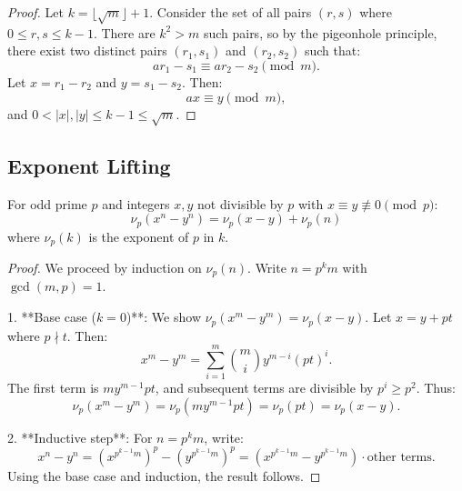 \documentclass{scrartcl} %
\begin{document}
\begin{proof}
Let $k = \lfloor \sqrt{m} \rfloor + 1$. Consider the set of all pairs $(r, s)$ where $0 \leq r, s \leq k-1$. There are $k^2 > m$ such pairs, so by the pigeonhole principle, there exist two distinct pairs $(r_1, s_1)$ and $(r_2, s_2)$ such that:
\[
a r_1 - s_1 \equiv a r_2 - s_2 \pmod{m}.
\]
Let $x = r_1 - r_2$ and $y = s_1 - s_2$. Then:
\[
a x \equiv y \pmod{m},
\]
and $0 < |x|, |y| \leq k-1 \leq \sqrt{m}$.
\end{proof}

\subsection{Exponent Lifting}

\begin{theorem}\label{thm:liftingtheexponent}
For odd prime $p$ and integers $x,y$ not divisible by $p$ with $x \equiv y \not\equiv 0 \pmod{p}$:
\[ \nu_p(x^n - y^n) = \nu_p(x - y) + \nu_p(n) \]
where $\nu_p(k)$ is the exponent of $p$ in $k$.
\end{theorem}

\begin{proof}
We proceed by induction on $\nu_p(n)$. Write $n = p^k m$ with $\gcd(m, p) = 1$.

1. **Base case ($k = 0$)**: We show $\nu_p(x^m - y^m) = \nu_p(x - y)$. Let $x = y + p t$ where $p \nmid t$. Then:
\[
x^m - y^m = \sum_{i=1}^m \binom{m}{i} y^{m-i} (p t)^i.
\]
The first term is $m y^{m-1} p t$, and subsequent terms are divisible by $p^{i} \geq p^2$. Thus:
\[
\nu_p(x^m - y^m) = \nu_p(m y^{m-1} p t) = \nu_p(p t) = \nu_p(x - y).
\]

2. **Inductive step**: For $n = p^k m$, write:
\[
x^n - y^n = (x^{p^{k-1} m})^p - (y^{p^{k-1} m})^p = (x^{p^{k-1} m} - y^{p^{k-1} m}) \cdot \text{other terms}.
\]
Using the base case and induction, the result follows.
\end{proof}
\end{document}
